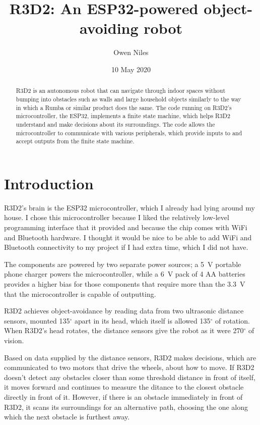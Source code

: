 \documentclass{article}
\title{R3D2: An ESP32-powered object-avoiding robot}
\author{Owen Niles}
\date{10 May 2020}
\begin{document}
\maketitle

\begin{abstract}

  R3D2 is an autonomous robot that can navigate through indoor spaces without
  bumping into obstacles such as walls and large household objects similarly to
  the way in which a Rumba or similar product does the same. The code running
  on R3D2's microcontroller, the ESP32, implements a finite state machine,
  which helps R3D2 understand and make decisions about its surroundings. The
  code allows the microcontroller to communicate with various peripherals,
  which provide inputs to and accept outputs from the finite state machine.

\end{abstract}

\section{Introduction} \label{sec:intro}

R3D2's brain is the ESP32 microcontroller, which I already had lying around my
house. I chose this microcontroller because I liked the relatively low-level
programming interface that it provided and because the chip comes with WiFi and
Bluetooth hardware. I thought it would be nice to be able to add WiFi and
Bluetooth connectivity to my project if I had extra time, which I did not have.

The components are powered by two separate power sources; a \SI{5}{\volt}
portable phone charger powers the microcontroller, while a \SI{6}{\volt} pack
of 4 AA batteries provides a higher bias for those components that require more
than the \SI{3.3}{\volt} that the microcontroller is capable of outputting.

R3D2 achieves object-avoidance by reading data from two ultrasonic distance
sensors, mounted 135$^\circ$ apart in its head, which itself is allowed
135$^\circ$ of rotation. When R3D2's head rotates, the distance sensors give
the robot as it were 270$^\circ$ of vision.

Based on data supplied by the distance sensors, R3D2 makes decisions, which
are communicated to two motors that drive the wheels, about how to move. If
R3D2 doesn't detect any obstacles closer than some threshold distance in front
of itself, it moves forward and continues to measure the ditance to the closest
obstacle directly in front of it. However, if there is an obstacle immediately
in front of R3D2, it scans its surroundings for an alternative path, choosing
the one along which the next obstacle is furthest away.
\end{document}
